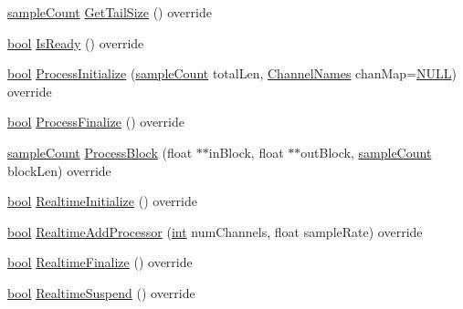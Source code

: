 \begin{DoxyCompactItemize}
\hyperlink{include_2audacity_2_types_8h_afa427e1f521ea5ec12d054e8bd4d0f71}{sample\+Count} \hyperlink{class_ladspa_effect_aa10a98d377fd2f160ccf2ec056afa61c}{Get\+Tail\+Size} () override
\item 
\hyperlink{mac_2config_2i386_2lib-src_2libsoxr_2soxr-config_8h_abb452686968e48b67397da5f97445f5b}{bool} \hyperlink{class_ladspa_effect_a717173975ed7c204c70cc086ee742bbd}{Is\+Ready} () override
\item 
\hyperlink{mac_2config_2i386_2lib-src_2libsoxr_2soxr-config_8h_abb452686968e48b67397da5f97445f5b}{bool} \hyperlink{class_ladspa_effect_a10ef971b0d9267270a8225feafccf1cc}{Process\+Initialize} (\hyperlink{include_2audacity_2_types_8h_afa427e1f521ea5ec12d054e8bd4d0f71}{sample\+Count} total\+Len, \hyperlink{include_2audacity_2_types_8h_a4f0f42a04250c39bbe0ce6cb26aa3b48}{Channel\+Names} chan\+Map=\hyperlink{px__mixer_8h_a070d2ce7b6bb7e5c05602aa8c308d0c4}{N\+U\+LL}) override
\item 
\hyperlink{mac_2config_2i386_2lib-src_2libsoxr_2soxr-config_8h_abb452686968e48b67397da5f97445f5b}{bool} \hyperlink{class_ladspa_effect_a9765bd729d331d81e339c7efefb97875}{Process\+Finalize} () override
\item 
\hyperlink{include_2audacity_2_types_8h_afa427e1f521ea5ec12d054e8bd4d0f71}{sample\+Count} \hyperlink{class_ladspa_effect_a3d89882b84f6ea70aa0dc67666f47f22}{Process\+Block} (float $\ast$$\ast$in\+Block, float $\ast$$\ast$out\+Block, \hyperlink{include_2audacity_2_types_8h_afa427e1f521ea5ec12d054e8bd4d0f71}{sample\+Count} block\+Len) override
\item 
\hyperlink{mac_2config_2i386_2lib-src_2libsoxr_2soxr-config_8h_abb452686968e48b67397da5f97445f5b}{bool} \hyperlink{class_ladspa_effect_a92905575677d03e21d1766c3a1059991}{Realtime\+Initialize} () override
\item 
\hyperlink{mac_2config_2i386_2lib-src_2libsoxr_2soxr-config_8h_abb452686968e48b67397da5f97445f5b}{bool} \hyperlink{class_ladspa_effect_ae2c1d84248ca195f4c54b25ad3f6a227}{Realtime\+Add\+Processor} (\hyperlink{xmltok_8h_a5a0d4a5641ce434f1d23533f2b2e6653}{int} num\+Channels, float sample\+Rate) override
\item 
\hyperlink{mac_2config_2i386_2lib-src_2libsoxr_2soxr-config_8h_abb452686968e48b67397da5f97445f5b}{bool} \hyperlink{class_ladspa_effect_a31af3c28a03c86387cecb893535fcbb5}{Realtime\+Finalize} () override
\item 
\hyperlink{mac_2config_2i386_2lib-src_2libsoxr_2soxr-config_8h_abb452686968e48b67397da5f97445f5b}{bool} \hyperlink{class_ladspa_effect_a00bee8938ceedfec2dbaea476fe2cfb1}{Realtime\+Suspend} () override

\end{DoxyCompactItemize}
